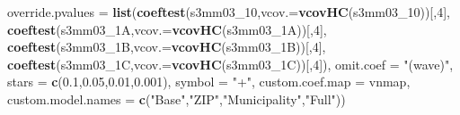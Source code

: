 \documentclass[
]{article}
\newenvironment{Shaded}{\begin{snugshade}}{\end{snugshade}}
\newcommand{\DataTypeTok}[1]{\textcolor[rgb]{0.13,0.29,0.53}{#1}}
\newcommand{\DecValTok}[1]{\textcolor[rgb]{0.00,0.00,0.81}{#1}}
\newcommand{\FloatTok}[1]{\textcolor[rgb]{0.00,0.00,0.81}{#1}}
\newcommand{\KeywordTok}[1]{\textcolor[rgb]{0.13,0.29,0.53}{\textbf{#1}}}
\newcommand{\NormalTok}[1]{#1}
\newcommand{\StringTok}[1]{\textcolor[rgb]{0.31,0.60,0.02}{#1}}
\begin{document}
\begin{Shaded}
\begin{Highlighting}[]
          \DataTypeTok{override.pvalues =} \KeywordTok{list}\NormalTok{(}\KeywordTok{coeftest}\NormalTok{(s3mm03_}\DecValTok{10}\NormalTok{,}\DataTypeTok{vcov.=}\KeywordTok{vcovHC}\NormalTok{(s3mm03_}\DecValTok{10}\NormalTok{))[,}\DecValTok{4}\NormalTok{],}
                                  \KeywordTok{coeftest}\NormalTok{(s3mm03_1A,}\DataTypeTok{vcov.=}\KeywordTok{vcovHC}\NormalTok{(s3mm03_1A))[,}\DecValTok{4}\NormalTok{],}
                                  \KeywordTok{coeftest}\NormalTok{(s3mm03_1B,}\DataTypeTok{vcov.=}\KeywordTok{vcovHC}\NormalTok{(s3mm03_1B))[,}\DecValTok{4}\NormalTok{],}
                                  \KeywordTok{coeftest}\NormalTok{(s3mm03_1C,}\DataTypeTok{vcov.=}\KeywordTok{vcovHC}\NormalTok{(s3mm03_1C))[,}\DecValTok{4}\NormalTok{]),}
          \DataTypeTok{omit.coef =} \StringTok{"(wave)"}\NormalTok{, }\DataTypeTok{stars =} \KeywordTok{c}\NormalTok{(}\FloatTok{0.1}\NormalTok{,}\FloatTok{0.05}\NormalTok{,}\FloatTok{0.01}\NormalTok{,}\FloatTok{0.001}\NormalTok{), }\DataTypeTok{symbol =} \StringTok{"+"}\NormalTok{,}
          \DataTypeTok{custom.coef.map =}\NormalTok{ vnmap, }
          \DataTypeTok{custom.model.names =} \KeywordTok{c}\NormalTok{(}\StringTok{"Base"}\NormalTok{,}\StringTok{"ZIP"}\NormalTok{,}\StringTok{"Municipality"}\NormalTok{,}\StringTok{"Full"}\NormalTok{))}
\end{Highlighting}
\end{Shaded}
\end{document}
